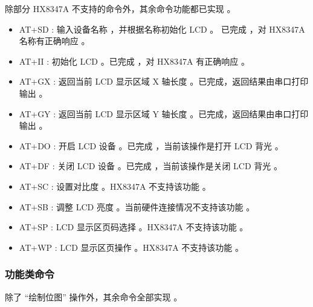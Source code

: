 \documentclass{article}
\begin{document}
除部分 HX8347A 不支持的命令外，其余命令功能都已实现 。
\begin{itemize}
\item AT+SD : 输入设备名称 ，并根据名称初始化 LCD 。 已完成 ，对 HX8347A 名称有正确响应 。 
\end{itemize}
\begin{itemize}
\item AT+II : 初始化 LCD 。已完成 ，对 HX8347A 有正确响应 。
\end{itemize}
\begin{itemize}
\item AT+GX : 返回当前 LCD 显示区域 X 轴长度 。已完成，返回结果由串口打印输出 。
\end{itemize}
\begin{itemize}
\item AT+GY : 返回当前 LCD 显示区域 Y 轴长度 。已完成，返回结果由串口打印输出 。
\end{itemize}
\begin{itemize}
\item AT+DO : 开启 LCD 设备 。已完成 ，当前该操作是打开 LCD 背光 。
\end{itemize}
\begin{itemize}
\item AT+DF : 关闭 LCD 设备 。已完成 ，当前该操作是关闭 LCD 背光 。
\end{itemize}
\begin{itemize}
\item AT+SC : 设置对比度 。HX8347A 不支持该功能 。
\end{itemize}
\begin{itemize}
\item AT+SB : 调整 LCD 亮度 。当前硬件连接情况不支持该功能 。
\end{itemize}
\begin{itemize}
\item AT+SP : LCD 显示区页码选择 。HX8347A 不支持该功能 。
\end{itemize}
\begin{itemize}
\item AT+WP : LCD 显示区页操作 。HX8347A 不支持该功能 。
\end{itemize}

\subsubsection{功能类命令}
\label{sec:功能类命令}

除了 “绘制位图” 操作外，其余命令全部实现 。
\end{document}
